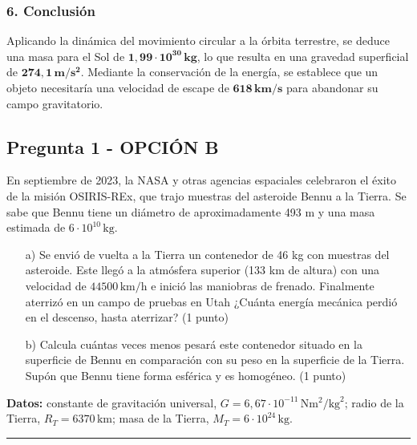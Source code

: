 \subsubsection*{6. Conclusión}
\begin{cajaconclusion}
    Aplicando la dinámica del movimiento circular a la órbita terrestre, se deduce una masa para el Sol de $\mathbf{1,99 \cdot 10^{30} \, kg}$, lo que resulta en una gravedad superficial de $\mathbf{274,1 \, m/s^2}$. Mediante la conservación de la energía, se establece que un objeto necesitaría una velocidad de escape de $\mathbf{618 \, km/s}$ para abandonar su campo gravitatorio.
\end{cajaconclusion}

\newpage

\subsection{Pregunta 1 - OPCIÓN B}
\label{subsec:1B_2025_jun_res}

\begin{cajaenunciado}
En septiembre de 2023, la NASA y otras agencias espaciales celebraron el éxito de la misión OSIRIS-REx, que trajo muestras del asteroide Bennu a la Tierra. Se sabe que Bennu tiene un diámetro de aproximadamente 493 m y una masa estimada de $6\cdot10^{10}\,\text{kg}$.
\begin{enumerate}
    \item[a)] Se envió de vuelta a la Tierra un contenedor de 46 kg con muestras del asteroide. Este llegó a la atmósfera superior (133 km de altura) con una velocidad de $44500\,\text{km/h}$ e inició las maniobras de frenado. Finalmente aterrizó en un campo de pruebas en Utah ¿Cuánta energía mecánica perdió en el descenso, hasta aterrizar? (1 punto)
    \item[b)] Calcula cuántas veces menos pesará este contenedor situado en la superficie de Bennu en comparación con su peso en la superficie de la Tierra. Supón que Bennu tiene forma esférica y es homogéneo. (1 punto)
\end{enumerate}
\textbf{Datos:} constante de gravitación universal, $G=6,67\cdot10^{-11}\,\text{N}\text{m}^2/\text{kg}^2$; radio de la Tierra, $R_T=6370\,\text{km}$; masa de la Tierra, $M_T=6\cdot10^{24}\,\text{kg}$.
\end{cajaenunciado}
\hrule

